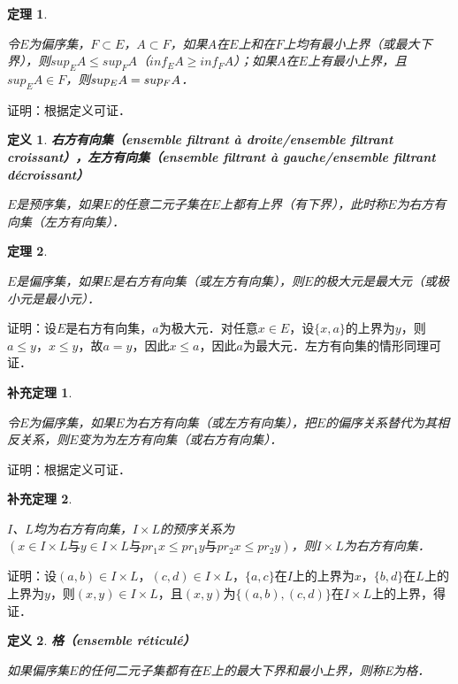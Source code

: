 \documentclass[12pt, a4paper, oneside]{book}
\newtheorem{theo}{定理}
\newtheorem{cor}{补充定理}
\newtheorem{de}{定义}
\begin{document}
			\begin{theo}\label{theo67}
				\hfill\par
				令$E$为偏序集，$F\subset E$，$A\subset F$，如果$A$在$E$上和在$F$上均有最小上界（或最大下界），则$sup_EA\leq sup_FA$（$inf_EA\geq inf_FA$）；如果$A$在$E$上有最小上界，且$sup_EA\in F$，则$sup_EA\\=sup_FA$．
			\end{theo}
			证明：根据定义可证．

			\begin{de}
				\textbf{右方有向集（ensemble filtrant à droite/ensemble filtrant croissant），左方有向集（ensemble filtrant à gauche/ensemble filtrant décroissant）}
				\par
				$E$是预序集，如果$E$的任意二元子集在$E$上都有上界（有下界），此时称$E$为右方有向集（左方有向集）．
			\end{de}
			
			\begin{theo}\label{theo68}
				\hfill\par
				$E$是偏序集，如果$E$是右方有向集（或左方有向集），则$E$的极大元是最大元（或极小元是最小元）．
			\end{theo}
			证明：设$E$是右方有向集，$a$为极大元．对任意$x\in E$，设$\{x, a\}$的上界为$y$，则$a\leq y$，$x\leq y$，故$a=y$，因此$x\leq a$，因此$a$为最大元．左方有向集的情形同理可证．
						
			\begin{cor}\label{cor186}
				\hfill\par
				令$E$为偏序集，如果$E$为右方有向集（或左方有向集），把$E$的偏序关系替代为其相反关系，则$E$变为为左方有向集（或右方有向集）．
			\end{cor}
			证明：根据定义可证．
			
			\begin{cor}\label{cor187}
				\hfill\par
				$I$、$L$均为右方有向集，$I\times L$的预序关系为$(x\in I\times L\text{与}y\in I\times L\text{与}pr_1x\leq pr_1y\text{与}pr_2x\leq pr_2y)$，则$I\times L$为右方有向集．
			\end{cor}
			证明：设$(a, b)\in I\times L$，$(c, d)\in I\times L$，$\{a, c\}$在$I$上的上界为$x$，$\{b, d\}$在$L$上的上界为$y$，则$(x, y) \in I\times L$，且$(x, y)$为$\{(a, b), (c, d)\}$在$I\times L$上的上界，得证．			
			
			\begin{de}
				\textbf{格（ensemble réticulé）}
				\par
				如果偏序集$E$的任何二元子集都有在$E$上的最大下界和最小上界，则称E为格．
			\end{de}
\end{document}

